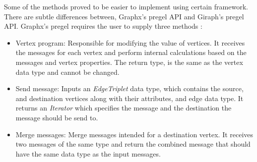 \documentclass[english]{tktltiki}
\begin{document}
Some of the methods proved to be easier to implement using certain framework. There are subtle differences between, Graphx's pregel API and Giraph's pregel API. Graphx's pregel requires the user to supply three methods : 
\begin{itemize}
\item Vertex program: Responsible for modifying the value of vertices. It receives the messages for each vertex and perform internal calculations based on the messages and vertex properties. The return type, is the same as the vertex data type and cannot be changed.
\item Send message: Inputs an \textit{EdgeTriplet} data type, which contains the source, and destination vertices along with their attributes, and edge data type. It returns an \textit{Iterator} which specifies the message and the destination the message should be send to.
\item Merge messages: Merge messages intended for a destination vertex. It receives two messages of the same type and return the combined message that should have the same data type as the input messages.
\end{itemize}
\end{document}
